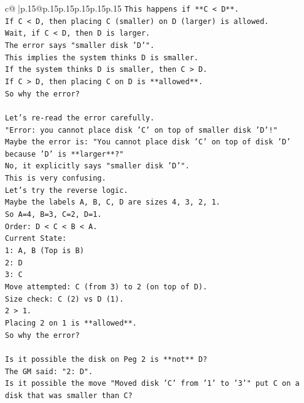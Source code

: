 \documentclass{article}
\begin{document}
{\begin{supertabular}{c@{$\;$}|p{.15\linewidth}@{}p{.15\linewidth}p{.15\linewidth}p{.15\linewidth}p{.15\linewidth}p{.15\linewidth}}
{{{\texttt{This happens if **C < D**.} \\
\texttt{If C < D, then placing C (smaller) on D (larger) is allowed.} \\
\texttt{Wait, if C < D, then D is larger.} \\
\texttt{The error says "smaller disk 'D'".} \\
\texttt{This implies the system thinks D is smaller.} \\
\texttt{If the system thinks D is smaller, then C > D.} \\
\texttt{If C > D, then placing C on D is **allowed**.} \\
\texttt{So why the error?} \\
\\ 
\texttt{Let's re{-}read the error carefully.} \\
\texttt{"Error: you cannot place disk 'C' on top of smaller disk 'D'!"} \\
\texttt{Maybe the error is: "You cannot place disk 'C' on top of disk 'D' because 'D' is **larger**?"} \\
\texttt{No, it explicitly says "smaller disk 'D'".} \\
\texttt{This is very confusing.} \\
\texttt{Let's try the reverse logic.} \\
\texttt{Maybe the labels A, B, C, D are sizes 4, 3, 2, 1.} \\
\texttt{So A=4, B=3, C=2, D=1.} \\
\texttt{Order: D < C < B < A.} \\
\texttt{Current State:} \\
\texttt{1: A, B (Top is B)} \\
\texttt{2: D} \\
\texttt{3: C} \\
\texttt{Move attempted: C (from 3) to 2 (on top of D).} \\
\texttt{Size check: C (2) vs D (1).} \\
\texttt{2 > 1.} \\
\texttt{Placing 2 on 1 is **allowed**.} \\
\texttt{So why the error?} \\
\\ 
\texttt{Is it possible the disk on Peg 2 is **not** D?} \\
\texttt{The GM said: "2: D".} \\
\texttt{Is it possible the move "Moved disk 'C' from '1' to '3'" put C on a disk that was smaller than C?} \\
}}}
\end{supertabular}}
\end{document}
